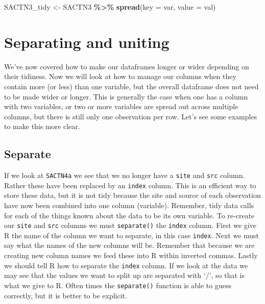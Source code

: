 \documentclass[
]{book}
\newenvironment{Shaded}{\begin{snugshade}}{\end{snugshade}}
\newcommand{\DataTypeTok}[1]{\textcolor[rgb]{0.13,0.29,0.53}{#1}}
\newcommand{\KeywordTok}[1]{\textcolor[rgb]{0.13,0.29,0.53}{\textbf{#1}}}
\newcommand{\NormalTok}[1]{#1}
\newcommand{\OperatorTok}[1]{\textcolor[rgb]{0.81,0.36,0.00}{\textbf{#1}}}
\newcommand{\StringTok}[1]{\textcolor[rgb]{0.31,0.60,0.02}{#1}}
\begin{document}
\begin{Shaded}
\begin{Highlighting}[]
\NormalTok{SACTN3\_tidy <{-}}\StringTok{ }\NormalTok{SACTN3 }\OperatorTok{\%>\%}\StringTok{ }
\StringTok{  }\KeywordTok{spread}\NormalTok{(}\DataTypeTok{key =}\NormalTok{ var, }\DataTypeTok{value =}\NormalTok{ val)}
\end{Highlighting}
\end{Shaded}

\hypertarget{separating-and-uniting}{%
\section{Separating and uniting}\label{separating-and-uniting}}

We've now covered how to make our dataframes longer or wider depending on their tidiness. Now we will look at how to manage our columns when they contain more (or less) than one variable, but the overall dataframe does not need to be made wider or longer. This is generally the case when one has a column with two variables, or two or more variables are spread out across multiple columns, but there is still only one observation per row. Let's see some examples to make this more clear.

\hypertarget{separate}{%
\subsection{Separate}\label{separate}}

If we look at \texttt{SACTN4a} we see that we no longer have a \texttt{site} and \texttt{src} column. Rather these have been replaced by an \texttt{index} column. This is an efficient way to store these data, but it is not tidy because the site and source of each observation have now been combined into one column (variable). Remember, tidy data calls for each of the things known about the data to be its own variable. To re-create our \texttt{site} and \texttt{src} columns we must \texttt{separate()} the \texttt{index} column. First we give R the name of the column we want to separate, in this case \texttt{index}. Next we must say what the names of the new columns will be. Remember that because we are creating new column names we feed these into R within inverted commas. Lastly we should tell R how to separate the \texttt{index} column. If we look at the data we may see that the values we want to split up are separated with `/', so that is what we give to R. Often times the \texttt{separate()} function is able to guess correctly, but it is better to be explicit.
\end{document}
